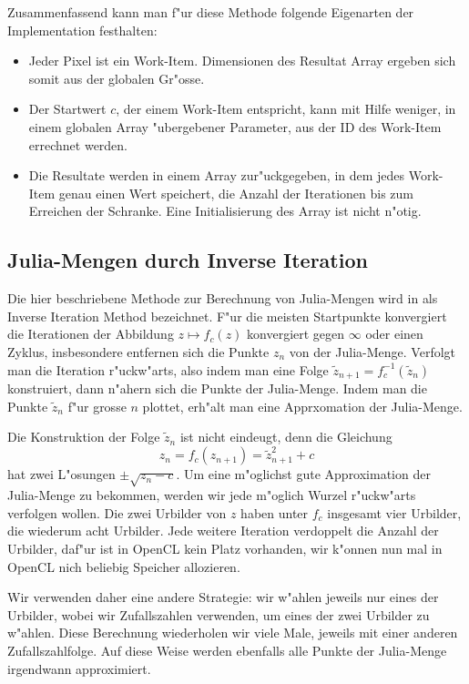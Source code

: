 \begin{refsection}
Zusammenfassend kann man f"ur diese Methode folgende Eigenarten der
Implementation festhalten:
\begin{itemize}
\item Jeder Pixel ist ein Work-Item. Dimensionen des Resultat Array
ergeben sich somit aus der globalen Gr"osse.
\item Der Startwert $c$, der einem Work-Item entspricht, kann mit Hilfe
weniger, in einem globalen Array "ubergebener Parameter, aus der
ID des Work-Item errechnet werden.
\item Die Resultate werden in einem Array zur"uckgegeben, in dem jedes
Work-Item genau einen Wert speichert, die Anzahl der Iterationen bis
zum Erreichen der Schranke.
Eine Initialisierung des Array ist nicht n"otig.
\end{itemize}

\subsection{Julia-Mengen durch Inverse Iteration}
Die hier beschriebene Methode zur Berechnung von Julia-Mengen wird in
\cite{julia:peitgenrichter} als Inverse Iteration Method bezeichnet.
F"ur die meisten Startpunkte konvergiert die Iterationen der Abbildung
$z\mapsto f_c(z)$ konvergiert gegen $\infty$
oder einen Zyklus, insbesondere entfernen sich die Punkte $z_n$ von der
Julia-Menge.
Verfolgt man die Iteration r"uckw"arts, also indem man eine Folge
$\tilde z_{n+1}=f_c^{-1}(\tilde z_n)$ konstruiert, dann n"ahern sich die
Punkte der Julia-Menge. Indem man die Punkte $\tilde z_n$ f"ur grosse $n$
plottet, erh"alt man eine Apprxomation der Julia-Menge.

Die Konstruktion der Folge $\tilde z_n$ ist nicht eindeugt, denn die
Gleichung
\[
z_n= f_c(z_{n+1})=\tilde z_{n+1}^2+c
\]
hat zwei L"osungen $\pm\sqrt{z_n-c}$. 
Um eine m"oglichst gute Approximation der Julia-Menge zu bekommen, 
werden wir jede m"oglich Wurzel r"uckw"arts verfolgen wollen.
Die zwei Urbilder von $z$ haben unter $f_c$ insgesamt vier Urbilder, 
die wiederum acht Urbilder.
Jede weitere Iteration verdoppelt die Anzahl der Urbilder, daf"ur ist
in OpenCL kein Platz vorhanden, wir k"onnen nun mal in OpenCL nich beliebig
Speicher allozieren.

Wir verwenden daher eine andere Strategie: wir w"ahlen jeweils nur eines
der Urbilder, wobei wir Zufallszahlen verwenden, um eines der zwei
Urbilder zu w"ahlen.
Diese Berechnung wiederholen wir viele Male, jeweils mit einer anderen
Zufallszahlfolge.
Auf diese Weise werden ebenfalls alle Punkte der Julia-Menge irgendwann
approximiert.


\end{refsection}
